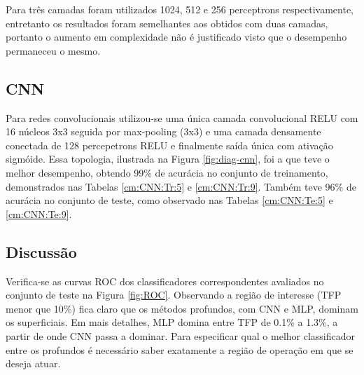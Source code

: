 \begin{table}

\end{table}

Para três camadas foram utilizados 1024, 512 e 256 perceptrons respectivamente, entretanto os resultados foram semelhantes aos obtidos com duas camadas, portanto o aumento em complexidade não é justificado visto que o desempenho permaneceu o mesmo.

\subsection{CNN}
Para redes convolucionais utilizou-se uma única camada convolucional RELU com 16 núcleos 3x3 seguida por max-pooling (3x3) e uma camada densamente conectada de 128 percepetrons RELU e finalmente saída única com ativação sigmóide. Essa topologia, ilustrada na Figura \ref{fig:diag-cnn}, foi a que teve o melhor desempenho, obtendo 99\% de acurácia no conjunto de treinamento, demonstrados nas Tabelas \ref{cm:CNN:Tr:5} e \ref{cm:CNN:Tr:9}. Também teve 96\% de acurácia no conjunto de teste, como observado nas Tabelas \ref{cm:CNN:Te:5} e \ref{cm:CNN:Te:9}.

\begin{table}

\end{table}


\subsection{Discussão}
Verifica-se as curvas ROC dos classificadores correspondentes avaliados no conjunto de teste na Figura \ref{fig:ROC}. Observando a região de interesse (TFP menor que 10\%) fica claro que os métodos profundos, com CNN e MLP, dominam os superficiais. Em mais detalhes, MLP domina entre TFP de 0.1\% a 1.3\%, a partir de onde CNN passa a dominar. Para especificar qual o melhor classificador entre os profundos é necessário saber exatamente a região de operação em que se deseja atuar. 

